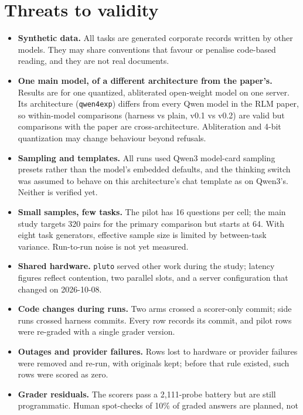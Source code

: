 \documentclass[11pt]{article}
\newcommand{\code}[1]{\texttt{#1}}
\begin{document}
\section{Threats to validity}
\label{sec:threats}

\begin{itemize}[leftmargin=*]
\item \textbf{Synthetic data.} All tasks are generated corporate records written by
  other models. They may share conventions that favour or penalise code-based
  reading, and they are not real documents.
\item \textbf{One main model, of a different architecture from the paper's.} Results
  are for one quantized, abliterated open-weight model on one server. Its architecture
  (\code{qwen4exp}) differs from every Qwen model in the RLM paper, so within-model
  comparisons (harness vs plain, v0.1 vs v0.2) are valid but comparisons with the paper
  are cross-architecture. Abliteration and 4-bit quantization may change behaviour
  beyond refusals.
\item \textbf{Sampling and templates.} All runs used Qwen3 model-card sampling presets
  rather than the model's embedded defaults, and the thinking switch was assumed to
  behave on this architecture's chat template as on Qwen3's. Neither is verified yet.
\item \textbf{Small samples, few tasks.} The pilot has 16 questions per cell; the main
  study targets 320 pairs for the primary comparison but starts at 64. With eight task
  generators, effective sample size is limited by between-task variance. Run-to-run noise
  is not yet measured.
\item \textbf{Shared hardware.} \code{pluto} served other work during the study;
  latency figures reflect contention, two parallel slots, and a server configuration
  that changed on 2026-10-08.
\item \textbf{Code changes during runs.} Two arms crossed a scorer-only commit;
  side runs crossed harness commits. Every row records its commit, and pilot rows were
  re-graded with a single grader version.
\item \textbf{Outages and provider failures.} Rows lost to hardware or provider
  failures were removed and re-run, with originals kept; before that rule existed,
  such rows were scored as zero.
\item \textbf{Grader residuals.} The scorers pass a 2,111-probe battery but are
  still programmatic. Human spot-checks of 10\% of graded answers are planned, not

\end{itemize}
\end{document}

